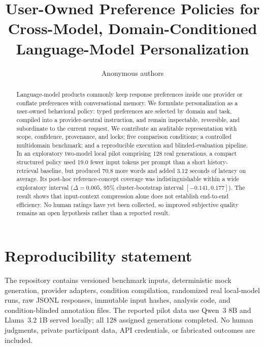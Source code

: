 \documentclass[11pt]{article}
\title{User-Owned Preference Policies for Cross-Model, Domain-Conditioned
Language-Model Personalization}
\author{Anonymous authors}
\date{}
\begin{document}
\maketitle

\begin{abstract}
Language-model products commonly keep response preferences inside one provider
or conflate preferences with conversational memory. We formulate personalization
as a user-owned behavioral policy: typed preferences are selected by domain and
task, compiled into a provider-neutral instruction, and remain inspectable,
reversible, and subordinate to the current request. We contribute an auditable
representation with scope, confidence, provenance, and locks; five comparison
conditions; a controlled multidomain benchmark; and a reproducible execution and
blinded-evaluation pipeline. In an exploratory two-model local pilot comprising
128 real generations, a compact structured policy used 19.0 fewer input tokens
per prompt than a short history-retrieval baseline, but produced 70.8 more words
and added 3.12 seconds of latency on average. Its post-hoc reference-concept
coverage was indistinguishable within a wide exploratory interval
($\Delta=0.005$, 95\% cluster-bootstrap interval $[-0.141,0.177]$). The result
shows that input-context compression alone does not establish end-to-end
efficiency. No human ratings have yet been collected, so improved subjective
quality remains an open hypothesis rather than a reported result.
\end{abstract}















\section*{Reproducibility statement}
The repository contains versioned benchmark inputs, deterministic mock generation,
provider adapters, condition compilation, randomized real local-model runs, raw
JSONL responses, immutable input hashes, analysis code, and condition-blinded
annotation files. The reported pilot data use Qwen~3 8B and Llama~3.2 1B served
locally; all 128 assigned generations completed. No human judgments, private
participant data, API credentials, or fabricated outcomes are included.
\end{document}
